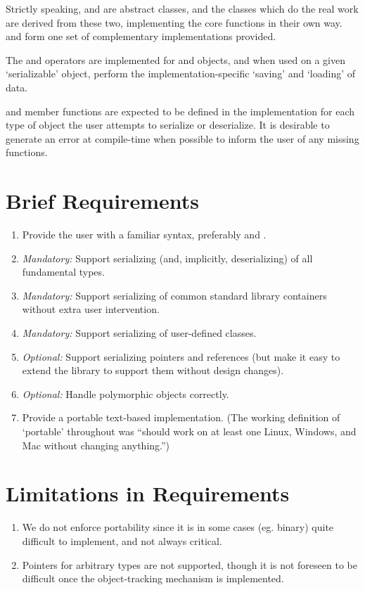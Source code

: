 \documentclass{article}
\begin{document}
Strictly speaking,  and  are
abstract classes, and the classes which do the real work are derived
from these two, implementing the core functions in their own
way.  and  form one set
of complementary implementations provided. 

The \code{<<} and \code{>>} operators are implemented for
 and  objects, and when used on
a given `serializable' object, perform the implementation-specific
`saving' and `loading' of data.

 and  member functions are expected to be
defined in the implementation for each type of object the user
attempts to serialize or deserialize. It is desirable to generate an
error at compile-time when possible to inform the user of any missing
functions.

\section{Brief Requirements}
\begin{enumerate}
\item Provide the user with a familiar syntax, preferably \code{<<} and \code{>>}.
\item \textit{Mandatory:} Support serializing (and, implicitly,
  deserializing) of all fundamental types.
\item \textit{Mandatory:} Support serializing of common standard
  library containers without extra user intervention.
\item \textit{Mandatory:} Support serializing of user-defined classes.
\item \textit{Optional:} Support serializing pointers and references
  (but make it easy to extend the library to support them without
  design changes).
\item \textit{Optional:} Handle polymorphic objects correctly.
\item Provide a portable text-based implementation. (The working
  definition of `portable' throughout was ``should work on at least
  one Linux, Windows, and Mac without changing anything.'')
\end{enumerate}

\section{Limitations in Requirements}
\begin{enumerate}
\item We do not enforce portability since it is in some cases
  (eg. binary) quite difficult to implement, and not always critical.
\item Pointers for arbitrary types are not supported, though it is not
  foreseen to be difficult once the object-tracking mechanism is
  implemented.
\end{enumerate}
\end{document}
